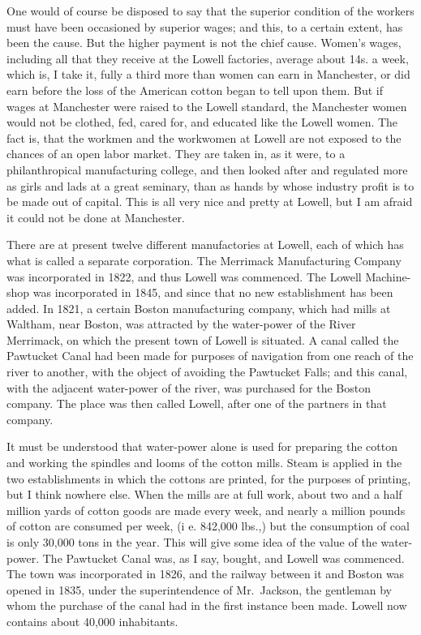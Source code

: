 One would of course be disposed to say that the superior condition
of the workers must have been occasioned by superior wages; and
this, to a certain extent, has been the cause.  But the higher
payment is not the chief cause.  Women's wages, including all that
they receive at the Lowell factories, average about 14s. a week,
which is, I take it, fully a third more than women can earn in
Manchester, or did earn before the loss of the American cotton
began to tell upon them.  But if wages at Manchester were raised to
the Lowell standard, the Manchester women would not be clothed,
fed, cared for, and educated like the Lowell women.  The fact is,
that the workmen and the workwomen at Lowell are not exposed to the
chances of an open labor market.  They are taken in, as it were, to
a philanthropical manufacturing college, and then looked after and
regulated more as girls and lads at a great seminary, than as hands
by whose industry profit is to be made out of capital.  This is all
very nice and pretty at Lowell, but I am afraid it could not be
done at Manchester.

There are at present twelve different manufactories at Lowell, each
of which has what is called a separate corporation.  The Merrimack
Manufacturing Company was incorporated in 1822, and thus Lowell was
commenced.  The Lowell Machine-shop was incorporated in 1845, and
since that no new establishment has been added.  In 1821, a certain
Boston manufacturing company, which had mills at Waltham, near
Boston, was attracted by the water-power of the River Merrimack, on
which the present town of Lowell is situated.  A canal called the
Pawtucket Canal had been made for purposes of navigation from one
reach of the river to another, with the object of avoiding the
Pawtucket Falls; and this canal, with the adjacent water-power of
the river, was purchased for the Boston company.  The place was
then called Lowell, after one of the partners in that company.

It must be understood that water-power alone is used for preparing
the cotton and working the spindles and looms of the cotton mills.
Steam is applied in the two establishments in which the cottons are
printed, for the purposes of printing, but I think nowhere else.
When the mills are at full work, about two and a half million yards
of cotton goods are made every week, and nearly a million pounds of
cotton are consumed per week, (i e. 842,000 lbs.,) but the
consumption of coal is only 30,000 tons in the year.  This will
give some idea of the value of the water-power.  The Pawtucket
Canal was, as I say, bought, and Lowell was commenced.  The town
was incorporated in 1826, and the railway between it and Boston was
opened in 1835, under the superintendence of Mr.\ Jackson, the
gentleman by whom the purchase of the canal had in the first
instance been made.  Lowell now contains about 40,000 inhabitants.


